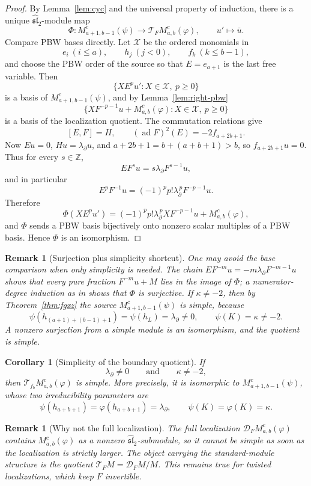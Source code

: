 \documentclass[11pt,a4paper]{article}
\newcommand{\Z}{\mathbb Z}
\newcommand{\slh}{\widehat{\mathfrak{sl}}_2}
\newcommand{\ad}{\operatorname{ad}}
\newcommand{\X}{\mathcal X}
\newcommand{\D}{\mathcal D}
\newcommand{\T}{\mathcal T}
\theoremstyle{plainupright}
\newtheorem{corollary}[proposition]{Corollary}
\newtheorem{remark}[proposition]{Remark}
\begin{document}
\begin{proof}
By Lemma~\ref{lem:cyc} and the universal property of induction, there is a
unique \(\slh\)-module map
\[
\Phi:M^c_{a+1,b-1}(\psi)\longrightarrow\T_FM^c_{a,b}(\varphi),
\qquad u'\longmapsto\bar u.
\]
Compare PBW bases directly. Let \(\X\) be the ordered monomials in
\[
e_i\ (i\le a),\qquad h_j\ (j<0),\qquad f_k\ (k\le b-1),
\]
and choose the PBW order of the source so that \(E=e_{a+1}\) is the last free
variable. Then
\[
\{XE^pu':X\in\X,\ p\ge0\}
\]
is a basis of \(M^c_{a+1,b-1}(\psi)\), and by Lemma~\ref{lem:right-pbw}
\[
\{XF^{-p-1}u+M^c_{a,b}(\varphi):X\in\X,\ p\ge0\}
\]
is a basis of the localization quotient. The commutation relations give
\[
[E,F]=H,\qquad (\ad F)^2(E)=-2f_{a+2b+1}.
\]
Now \(Eu=0\), \(Hu=\lambda_\partial u\), and
\(a+2b+1=b+(a+b+1)>b\), so \(f_{a+2b+1}u=0\). Thus for every \(s\in\Z\),
\[
EF^su=s\lambda_\partial F^{s-1}u,
\]
and in particular
\[
E^pF^{-1}u=(-1)^pp!\lambda_\partial^{\,p}F^{-p-1}u.
\]
Therefore
\[
\Phi(XE^pu')
=(-1)^pp!\lambda_\partial^{\,p}XF^{-p-1}u+M^c_{a,b}(\varphi),
\]
and \(\Phi\) sends a PBW basis bijectively onto nonzero scalar multiples of a
PBW basis. Hence \(\Phi\) is an isomorphism.
\end{proof}

\begin{remark}[Surjection plus simplicity shortcut]\label{rem:shortcut}
One may avoid the base comparison when only simplicity is needed. The chain
\(EF^{-m}u=-m\lambda_\partial F^{-m-1}u\) shows that every pure fraction
\(F^{-m}u+M\) lies in the image of \(\Phi\); a numerator-degree induction as in
\cite[Lemma 2.2]{Nonboundary} shows that \(\Phi\) is surjective. If
\(\kappa\ne-2\), then by Theorem~\ref{thm:fgxz} the source
\(M^c_{a+1,b-1}(\psi)\) is simple, because
\[
\psi(h_{(a+1)+(b-1)+1})=\psi(h_L)=\lambda_\partial\ne0,\qquad
\psi(K)=\kappa\ne-2.
\]
A nonzero surjection from a simple module is an isomorphism, and the quotient
is simple.
\end{remark}

\begin{corollary}[Simplicity of the boundary quotient]\label{cor:simple}
If
\[
\lambda_\partial\ne0\qquad\text{and}\qquad \kappa\ne-2,
\]
then \(\T_{f_b}M^c_{a,b}(\varphi)\) is simple. More precisely, it is
isomorphic to \(M^c_{a+1,b-1}(\psi)\), whose two irreducibility parameters are
\[
\psi(h_{a+b+1})=\varphi(h_{a+b+1})=\lambda_\partial,
\qquad
\psi(K)=\varphi(K)=\kappa.
\]
\end{corollary}

\begin{remark}[Why not the full localization]\label{rem:full}
The full localization \(\D_FM^c_{a,b}(\varphi)\) contains
\(M^c_{a,b}(\varphi)\) as a nonzero \(\slh\)-submodule, so it cannot be simple
as soon as the localization is strictly larger. The object carrying the
standard-module structure is the quotient \(\T_FM=\D_FM/M\). This remains true
for twisted localizations, which keep \(F\) invertible.
\end{remark}
\end{document}
